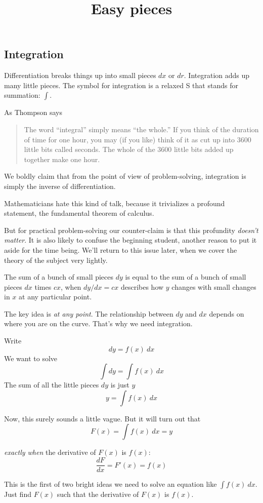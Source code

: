 \documentclass[11pt, oneside]{article}
\title{Easy pieces}
\date{}
\begin{document}
\maketitle
\Large

\subsection*{Integration}
Differentiation breaks things up into small pieces $dx$ or $dr$.  Integration adds up many little pieces.  The symbol for integration is a relaxed S that stands for summation:  $\int$.

As Thompson says
\begin{quote}The word “integral” simply means “the whole.” If you think of the duration of time for one hour, you may (if you like) think of it as cut up into 3600 little bits called seconds. The whole of the 3600 little bits added up together make one hour.\end{quote}

We boldly claim that from the point of view of problem-solving, integration is simply the inverse of differentiation.  

Mathematicians hate this kind of talk, because it trivializes a profound statement, the fundamental theorem of calculus.  

But for practical problem-solving our counter-claim is that this profundity \emph{doesn't matter}.  It is also likely to confuse the beginning student, another reason to put it aside for the time being.  We'll return to this issue later, when we cover the theory of the subject very lightly.

The sum of a bunch of small pieces $dy$ is equal to the sum of a bunch of small pieces $dx$ times $cx$, when $dy/dx= cx$ describes how $y$ changes with small changes in $x$ at any particular point. 

The key idea is \emph{at any point}.  The relationship between $dy$ and $dx$ depends on where you are on the curve.  That's why we need integration.

Write
\[ dy =  f(x) \ dx \]
We want to solve
\[ \int dy = \int f(x) \ dx \]
The sum of all the little pieces $dy$ is just $y$
\[ y = \int f(x) \ dx \]

Now, this surely sounds a little vague.  But it will turn out that
\[ F(x) =  \int f(x) \ dx = y \]

\emph{exactly when} the derivative of $F(x)$ is $f(x)$:
\[ \frac{dF}{dx} = F'(x) = f(x) \]

This is the first of two bright ideas we need to solve an equation like $ \int f(x) \ dx$.  Just find $F(x)$ such that the derivative of $F(x)$ is $f(x)$.
\end{document}
